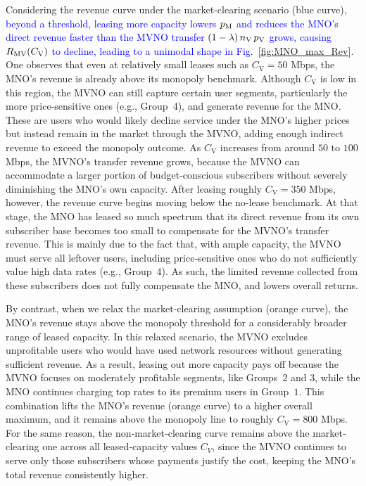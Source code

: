 \documentclass[12pt, draftclsnofoot, onecolumn]{IEEEtran}
\begin{document}
		Considering the revenue curve under the market-clearing scenario (blue curve), \textcolor{blue}{beyond a threshold, leasing more capacity lowers \(p_{\rm M}\) and reduces the MNO's direct revenue faster than the MVNO transfer \((1-\lambda)\,n_{\rm V}\,p_{\rm V}\) grows, causing \(R_{\rm MV}(C_{\rm V})\) to decline, leading to a unimodal shape in Fig.~\ref{fig:MNO_max_Rev}}. One observes that even at relatively small leases such as \(C_{\mathrm{V}}=50\) Mbps, the MNO’s revenue is already above its monopoly benchmark.  Although \(C_{\mathrm{V}}\) is low in this region, the MVNO can still capture certain user segments, particularly the more price‐sensitive ones (e.g., Group~4), and generate revenue for the MNO.  These are users who would likely decline service under the MNO's higher prices but instead remain in the market through the MVNO, adding enough indirect revenue to exceed the monopoly outcome.  As \(C_{\mathrm{V}}\) increases from around $50$ to $100$ Mbps, the MVNO's transfer revenue grows, because the MVNO can accommodate a larger portion of budget‐conscious subscribers without severely diminishing the MNO’s own capacity.  After leasing roughly \(C_{\mathrm{V}}=350\) Mbps, however, the revenue curve begins moving below the no‐lease benchmark. At that stage, the MNO has leased so much spectrum that its direct revenue from its own subscriber base becomes too small to compensate for the MVNO's transfer revenue. This is mainly due to the fact that, with ample capacity, the MVNO must serve all leftover users, including price‐sensitive ones who do not sufficiently value high data rates (e.g., Group~4). As such, the limited revenue collected from these subscribers does not fully compensate the MNO, and lowers overall returns.
		
		By contrast, when we relax the market-clearing assumption (orange curve), the MNO’s revenue stays above the monopoly threshold for a considerably broader range of leased capacity.  In this relaxed scenario, the MVNO excludes unprofitable users who would have used network resources without generating sufficient revenue. As a result, leasing out more capacity pays off because the MVNO focuses on moderately profitable segments, like Groups~$2$ and $3$, while the MNO continues charging top rates to its premium users in Group~$1$.  This combination lifts the MNO's revenue (orange curve) to a higher overall maximum, and it remains above the monopoly line to roughly \(C_{\mathrm{V}}=800\) Mbps.  For the same reason, the non‐market‐clearing curve remains above the market‐clearing one across all leased‐capacity values \(C_V\), since the MVNO continues to serve only those subscribers whose payments justify the cost, keeping the MNO’s total revenue consistently higher.
		
\end{document}
